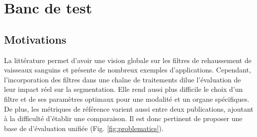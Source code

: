 %

\chapter{Banc de test}
\label{sec:Benchmark}
\section{Motivations}
\label{sec:Benchmark:Motivations}
 La littérature permet d'avoir une vision globale sur les filtres de rehaussement de vaisseaux sanguins et présente de nombreux exemples d'applications. Cependant, l'incorporation des filtres dans une chaîne de traitements dilue l'évaluation de leur impact réel sur la segmentation. Elle rend aussi plus difficile le choix d'un filtre et de ses paramètres optimaux pour une modalité et un organe spécifiques. De plus, les métriques de référence varient aussi entre deux publications, ajoutant à la difficulté d'établir une comparaison. Il est donc pertinent de proposer une base de d'évaluation unifiée (Fig. \ref{fig:problematics}).

